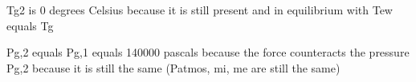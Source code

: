 Tg2 is 0 degrees Celsius because it is still present and in equilibrium with Tew equals Tg

Pg,2 equals Pg,1 equals 140000 pascals because the force counteracts the pressure Pg,2 because it is still the same (Patmos, mi, me are still the same)